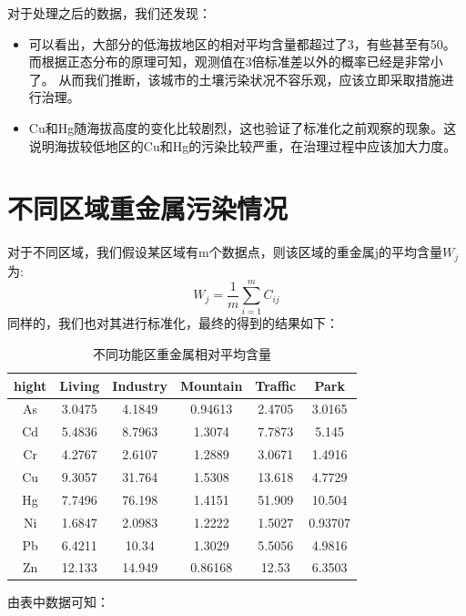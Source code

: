 \documentclass[a4paper]{article}
\begin{document}
对于处理之后的数据，我们还发现：
\begin{itemize}
\item 可以看出，大部分的低海拔地区的相对平均含量都超过了3，有些甚至有50。而根据正态分布的原理可知，观测值在3倍标准差以外的概率已经是非常小了。
从而我们推断，该城市的土壤污染状况不容乐观，应该立即采取措施进行治理。
\item Cu和Hg随海拔高度的变化比较剧烈，这也验证了标准化之前观察的现象。这说明海拔较低地区的Cu和Hg的污染比较严重，在治理过程中应该加大力度。
\end{itemize}
\section{不同区域重金属污染情况}
对于不同区域，我们假设某区域有m个数据点，则该区域的重金属j的平均含量$W_j$为:
\begin{equation}
W_j=\frac{1}{m}\sum_{i=1}^m C_{ij}
\end{equation}
\indent 同样的，我们也对其进行标准化，最终的得到的结果如下：
\begin{table}[H]
		\centering
		\caption{不同功能区重金属相对平均含量}
		\label{average-contend}
		\begin{tabular}{c|ccccc}
			hight	  &    Living  &  Industry  &  Mountain  &  Traffic  &   Park    \\
			\hline
			As   & 3.0475  &  4.1849   &   0.94613   &  2.4705   &   3.0165      \\
    			Cd   & 5.4836  &  8.7963   &    1.3074   &  7.7873   &    5.145		\\
    			Cr   & 4.2767  &  2.6107   &    1.2889   &  3.0671   &   1.4916		\\
    			Cu   & 9.3057  &  31.764   &    1.5308   &  13.618   &   4.7729		\\
    			Hg   & 7.7496  &  76.198   &    1.4151   &  51.909   &   10.504		\\
    			Ni   & 1.6847  &  2.0983   &    1.2222   &  1.5027   &  0.93707		\\
    			Pb   & 6.4211  &   10.34   &    1.3029   &  5.5056   &   4.9816		\\
    			Zn   & 12.133  &  14.949   &   0.86168   &   12.53   &   6.3503		\\
		\end{tabular}
	\end{table}
由表中数据可知： 
\end{document}
